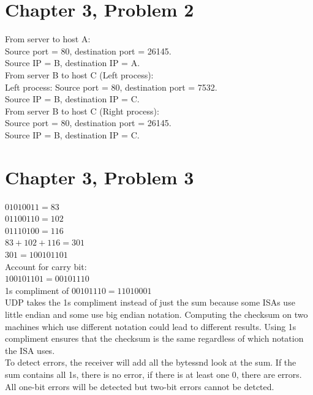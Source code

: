 \documentclass{article}
\begin{document}
\section*{Chapter 3, Problem 2}
From server to host A:\\
\newline Source port = 80, destination port = 26145.\\
Source IP = B, destination IP = A.\\
\newline From server B to host C (Left process):\\
\newline Left process: Source port = 80, destination port = 7532.\\
Source IP = B, destination IP = C.\\
\newline From server B to host C (Right process):\\
\newline Source port = 80, destination port = 26145.\\
Source IP = B, destination IP = C.\\
\clearpage

\section*{Chapter 3, Problem 3}
$01010011 = 83$\\
$01100110 = 102$\\
$01110100 = 116$\\
\newline $83 + 102 + 116 = 301$\\
$301 = 100101101$\\
\newline Account for carry bit:\\
$100101101 = 00101110$\\
\newline 1s compliment of $00101110 = 11010001$\\
\newline UDP takes the 1s compliment instead of just the sum because some ISAs use little endian and some use big endian notation.  Computing the checksum on two machines which use different notation could lead to different results.  Using 1s compliment ensures that the checksum is the same regardless of which notation the ISA uses.\\
\newline To detect errors, the receiver will add all the bytessnd look at the sum.  If the sum contains all 1s, there is no error, if there is at least one 0, there are errors.  All one-bit errors will be detected but two-bit errors cannot be detcted.\\
\end{document}
